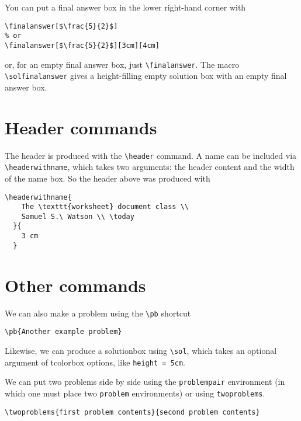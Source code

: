 \documentclass[julia,solutions]{worksheet}
\begin{document}
You can put a final answer box in the lower right-hand corner with

\begin{verbatim}
\finalanswer[$\frac{5}{2}$]
% or 
\finalanswer[$\frac{5}{2}$][3cm][4cm]
\end{verbatim} 

or, for an empty final answer box, just \texttt{\textbackslash finalanswer}. The macro \texttt{\textbackslash solfinalanswer} gives a height-filling empty solution box with an empty final answer box. 

\section{Header commands}

The header is produced with the \texttt{\textbackslash header} command. A name can be included via \texttt{\textbackslash headerwithname}, which takes two arguments: the header content and the width of the name box. So the header above was produced with
\begin{verbatim} 
\headerwithname{
    The \texttt{worksheet} document class \\ 
    Samuel S.\ Watson \\ \today
  }{
    3 cm 
  }
\end{verbatim}

\section{Other commands} 

We can also make a problem using the \texttt{\textbackslash pb} shortcut

\begin{verbatim} 
\pb{Another example problem}
\end{verbatim}


Likewise, we can produce a solutionbox using \texttt{\textbackslash sol}, which takes an optional argument of tcolorbox options, like \texttt{height = 5cm}. 

We can put two problems side by side using the \texttt{problempair} environment (in which one must place two \texttt{problem} environments) or using \texttt{twoproblems}. 

\begin{verbatim}
\twoproblems{first problem contents}{second problem contents}
\end{verbatim}
\end{document}
